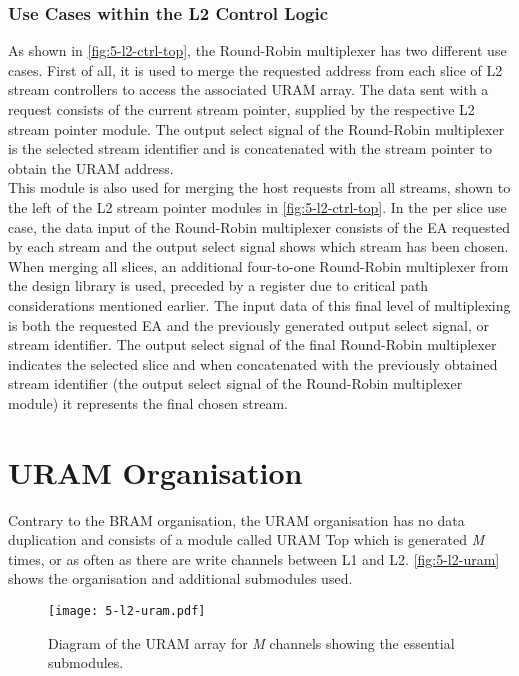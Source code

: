 \subsubsection{Use Cases within the L2 Control Logic}
As shown in \autoref{fig:5-l2-ctrl-top}, the Round-Robin multiplexer has two different use cases. First of all, it is used to merge the requested address from each slice of L2 stream controllers to access the associated URAM array. The data sent with a request consists of the current stream pointer, supplied by the respective L2 stream pointer module. The output select signal of the Round-Robin multiplexer is the selected stream identifier and is concatenated with the stream pointer to obtain the URAM address.\\
This module is also used for merging the host requests from all streams, shown to the left of the L2 stream pointer modules in \autoref{fig:5-l2-ctrl-top}. In the per slice use case, the data input of the Round-Robin multiplexer consists of the EA requested by each stream and the output select signal shows which stream has been chosen. When merging all slices, an additional four-to-one Round-Robin multiplexer from the design library is used, preceded by a register due to critical path considerations mentioned earlier. The input data of this final level of multiplexing is both the requested EA and the previously generated output select signal, or stream identifier. The output select signal of the final Round-Robin multiplexer indicates the selected slice and when concatenated with the previously obtained stream identifier (the output select signal of the Round-Robin multiplexer module) it represents the final chosen stream.





\section{URAM Organisation}
Contrary to the BRAM organisation, the URAM organisation has no data duplication and consists of a module called URAM Top which is generated \textit{M} times, or as often as there are write channels between L1 and L2. \autoref{fig:5-l2-uram} shows the organisation and additional submodules used.


\begin{figure}[H]
  \centering
  \texttt{[image: 5-l2-uram.pdf]}
  \caption{Diagram of the URAM array for \textit{M} channels showing the essential submodules.}
  \label{fig:5-l2-uram}
\end{figure}

